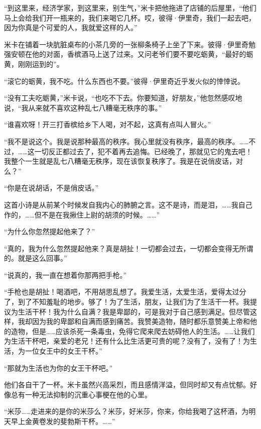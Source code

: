 \par “到这里来，经济学家，到这里来，别生气，”米卡把他拖进了店铺的后屋里，“他们马上会给我们开一瓶来的，我们来喝它几杯。哎，彼得·伊里奇，我们一起去吧，因为你真是个可爱的人，我就爱这样的人。”
\par 米卡在铺着一块肮脏桌布的小茶几旁的一张柳条椅子上坐了下来。彼得·伊里奇勉强安顿在他的对面，香槟酒马上送了过来。又问老爷们要不要吃蛎黄，“最好的蛎黄，刚刚运到的”。
\par “滚它的蛎黄，我不吃。什么东西也不要。”彼得·伊里奇近乎发火似的悻悻说。
\par “没有工夫吃蛎黄，”米卡说，“也吃不下去。你要知道，好朋友，”他忽然感叹地说，“我从来就不喜欢这种乱七八糟毫无秩序的事。”
\par “谁喜欢呀！开三打香槟给乡下人喝，对不起，这真有点叫人冒火。”
\par “我不是说这个。我是说那种最高的秩序。我心里就没有秩序，最高的秩序。……不过，……这一切反正都过去了，犯不着再去追悔。已经晚了，那就见它的鬼去吧！我整个一生就是乱七八糟毫无秩序，现在该恢复秩序了。我是在说俏皮话，对么？”
\par “你是在说胡话，不是俏皮话。”
\par 这首小诗是从前某个时候发自我内心的肺腑之言。这不是诗，而是泪，……我自己作的，……但不是在我揪住上尉的胡须的时候。……”
\par “为什么你忽然提起他来了？”
\par “真的，我为什么忽然提起他来？真是胡扯！一切都会过去，一切都会变得无所谓的。就是这么回事。”
\par “说真的，我一直在想着你那两把手枪。”
\par “手枪也是胡扯！喝酒吧，不用胡思乱想了。我爱生活，太爱生活，爱得太过分了，到了不知羞耻的地步。够了！为了生活，朋友，让我们为了生活干一杯。我提议为生活干杯！我为什么自满？我是卑鄙的，可是我对于自己感到满足。但尽管这样，我却因为我的卑鄙和自满而感到痛苦。我赞美造物，随时都乐意赞美上帝和他的造物，但是……应该杀死一条毒虫，免得它爬来爬去妨碍他人的生活。……让我们为生活干杯吧，亲爱的老兄！还有什么比生活更可贵的呢？没有了，没有了！为生活，为一位女王中的女王干杯。”
\par “那就为生活也为你的女王干杯吧。”
\par 他们各自干了一杯。米卡虽然兴高采烈，而且感情洋溢，但同时却又有点忧郁。好像总有一种无法抑制的沉重心事梗在他的心里。
\par “米莎……走进来的是你的米莎么？米莎，好米莎，你来，你给我喝了这杯酒，为明天早上金黄卷发的斐勃斯干杯。……”
